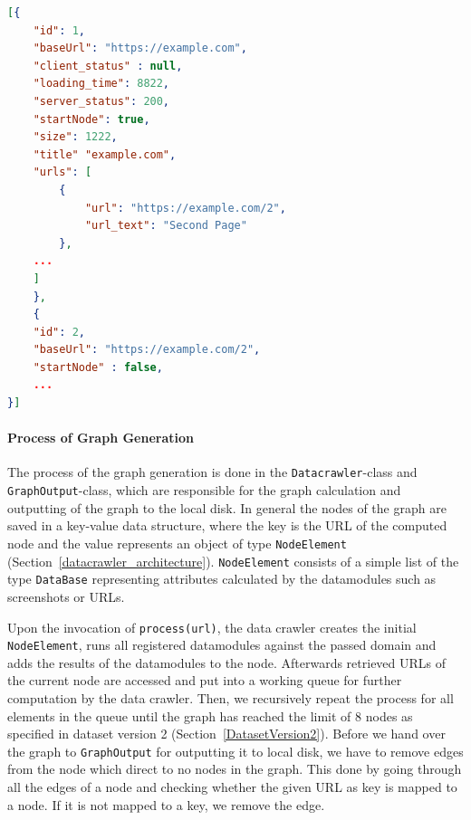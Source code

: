 \begin{lstlisting}[language=json,firstnumber=1,label={lst:examplecom_graph},
    language=Python,
    caption={[Example graph generated by the data crawler]Graph output for the domain \texttt{example.com}. The graph nodes are \texttt{json}-objects in the root array of the \texttt{json}-file. The \texttt{baseUrl}-attribute shows affiliation of the node to the given URL. Futhermore, each \texttt{json}-object consists of attributes mainly calculated in the URL-Datamodule such as client-sided and server-sided error (here: \texttt{client\_status} and \texttt{server\_status}), loading time, size and finally the valid URLs with the URL text. In general, all URLs found in the nodes are represented as nodes in the graph. Finally, each computed URL has an ID assigned, which represents respectively the name of the screenshots for the URL.},
    captionpos=b]
[{
	"id": 1,
	"baseUrl": "https://example.com",
	"client_status" : null,
	"loading_time": 8822,
	"server_status": 200,
	"startNode": true,
	"size": 1222,
	"title" "example.com",
	"urls": [
		{
			"url": "https://example.com/2",
			"url_text": "Second Page"
		},
	...
	]
	},
	{
	"id": 2,
	"baseUrl": "https://example.com/2",
	"startNode" : false,
	...
}]
\end{lstlisting}

\paragraph*{Process of Graph Generation} 
The process of the graph generation is done in the \texttt{Datacrawler}-class and \texttt{GraphOutput}-class, which are responsible for the graph calculation and outputting of the graph to the local disk. In general the nodes of the graph are saved in a key-value data structure, where the key is the URL of the computed node and the value represents an object of type \texttt{NodeElement} (Section~\ref{datacrawler_architecture}). \texttt{NodeElement} consists of a simple list of the type \texttt{DataBase} representing attributes calculated by the datamodules such as screenshots or URLs.

Upon the invocation of \texttt{process(url)}, the data crawler creates the initial \texttt{NodeElement}, runs all registered datamodules against the passed domain and adds the results of the datamodules to the node. Afterwards retrieved URLs of the current node are accessed and put into a working queue for further computation by the data crawler. Then, we recursively repeat the process for all elements in the queue until the graph has reached the limit of 8 nodes as specified in dataset version 2 (Section~\ref{DatasetVersion2}). Before we hand over the graph to \texttt{GraphOutput} for outputting it to local disk, we have to remove edges from the node which direct to no nodes in the graph. This done by going through all the edges of a node and checking whether the given URL as key is mapped to a node. If it is not mapped to a key, we remove the edge.

